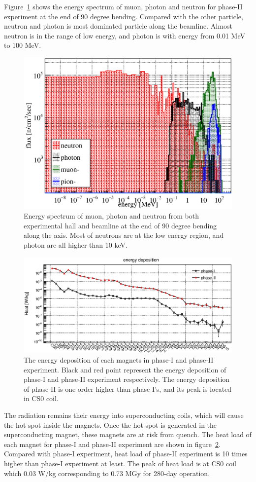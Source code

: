 Figure~\ref{2bending} shows the energy spectrum of muon, photon and neutron for phase-II experiment at the end of 90 degree bending.
Compared with the other particle, neutron and photon is most dominated particle along the beamline.
Almost neutron is in the range of low energy, and photon is with energy from 0.01 MeV to 100 MeV.
  \begin{figure}[H]
   \centering
   \includegraphics[scale=0.43]{chapter3/fig/Neutron.eps}
   \caption{Energy spectrum of muon, photon and neutron from both experimental hall and beamline at the end of 90 degree bending along the axis. Most of neutrons are at the low energy region, and photon are all higher than 10 keV.}
   \label{2bending}
  \end{figure}
  \begin{figure}[H]
   \centering
   \includegraphics[scale=0.45]{chapter3/fig/heat.eps}
   \caption{The energy deposition of each magnets in phase-I and phase-II experiment. Black and red point represent the energy deposition of phase-I and phase-II experiment respectively. The energy deposition of phase-II is one order higher than phase-I's, and its peak is located in CS0 coil.}
   \label{2heat}
  \end{figure}
The radiation remains their energy into superconducting coils, which will cause the hot spot inside the magnets.
Once the hot spot is generated in the superconducting magnet, these magnets are at risk from quench.
The heat load of each magnet for phase-I and phase-II experiment are shown in figure~\ref{2heat}.
Compared with phase-I experiment, heat load of phase-II experiment is 10 times higher than phase-I experiment at least.
The peak of heat load is at CS0 coil which 0.03 W/kg corresponding to 0.73 MGy for 280-day operation.

